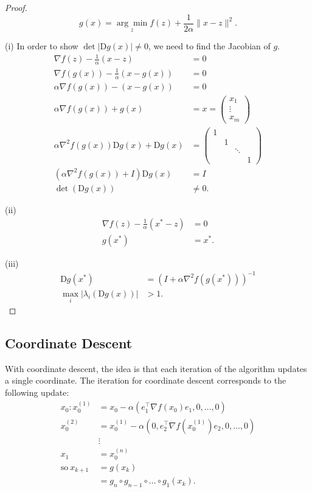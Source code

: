 \documentclass[twoside]{article}
\theoremstyle{definition}
\theoremstyle{definition}
\theoremstyle{remark}
\begin{document}
\begin{proof} 
\[
g(x) = \underset{z}{\arg\min} f(z) + \frac{1}{2\alpha} \| x - z \|^2.
\]

(i) In order to show $ \det | \text{D}g(x) | \neq 0 $, we need to find the Jacobian of $g$.
\[
\begin{aligned}
\nabla f(z) - \frac{1}{\alpha} (x - z) &= 0 \\
\nabla f(g(x)) - \frac{1}{\alpha} (x - g(x)) &= 0 \\
\alpha \nabla f(g(x)) - (x - g(x)) &= 0 \\
\alpha \nabla f(g(x)) + g(x) &= x = \left(\begin{smallmatrix} x_1 \\ \vdots \\ x_m\end{smallmatrix}\right) \\
\alpha \nabla^2 f(g(x)) \text{D}g(x) + \text{D}g(x) &= \begin{pmatrix}
1 & & & \\
& 1 & & \\
& & \ddots & \\
& & & 1
\end{pmatrix} \\
(\alpha \nabla^2 f(g(x)) + I) \text{D}g(x) &= I \\
\det (\text{D}g(x)) &\neq 0.
\end{aligned}
\]

(ii)
\[
\begin{aligned}
\nabla f(z) - \frac{1}{\alpha} (x^* - z) &= 0 \\
g(x^*) &= x^*.
\end{aligned}
\]

(iii)
\[
\begin{aligned}
\text{D}g(x^*) & = (I + \alpha \nabla^2 f(g(x^*)))^{-1} \\
\underset{i} \max | \lambda_i (\text{D}g(x)) | &> 1. 
\end{aligned}
\]

\end{proof}

\subsection{Coordinate Descent}

With coordinate descent, the idea is that each iteration of the algorithm updates a single coordinate. The iteration for coordinate descent corresponds to the following update:
\[
\begin{aligned}
x_0 : x_0^{(1)} &= x_0 - \alpha(e_1^\top \nabla f(x_0) e_1, 0, \ldots, 0) \\
x_0^{(2)} &= x_0^{(1)} - \alpha(0, e_2^\top \nabla f(x_0^{(1)}) e_2, 0, \ldots, 0) \\
&\vdots \\
x_1 &= x_0^{(n)} \\
\text{so} \ x_{k+1} &= g(x_k) \\
&= g_n \circ g_{n-1} \circ \ldots \circ g_1(x_k).
\end{aligned}
\]
\end{document}
